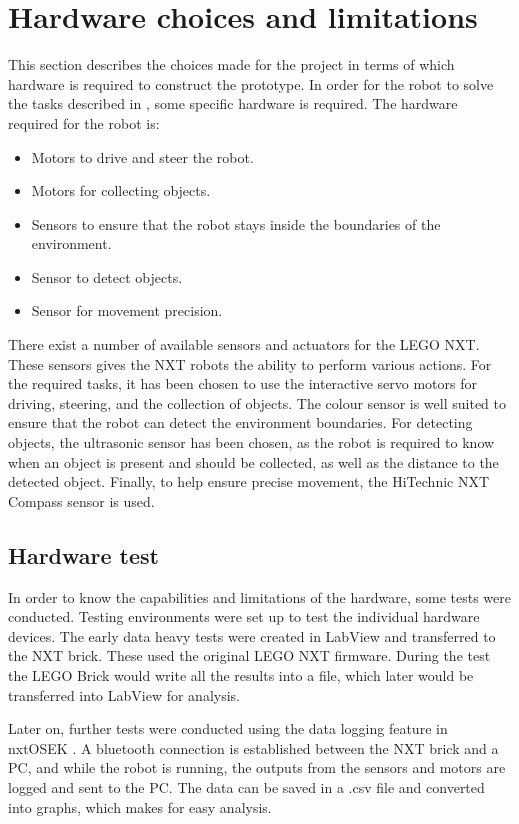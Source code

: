 \section{Hardware choices and limitations}\label{sec:hardware}

This section describes the choices made for the project in terms of which hardware is required to construct the \projname{} prototype. In order for the robot to solve the tasks described in , some specific hardware is required. The hardware required for the robot is:

\begin{itemize}
\item Motors to drive and steer the robot.
\item Motors for collecting objects.
\item Sensors to ensure that the robot stays inside the boundaries of the environment.
\item Sensor to detect objects.
\item Sensor for movement precision.
\end{itemize}

There exist a number of available sensors and actuators for the LEGO NXT. These sensors gives the NXT robots the ability to perform various actions. For the required tasks, it has been chosen to use the interactive servo motors for driving, steering, and the collection of objects. The colour sensor is well suited to ensure that the robot can detect the environment boundaries. For detecting objects, the ultrasonic sensor has been chosen, as the robot is required to know when an object is present and should be collected, as well as the distance to the detected object. Finally, to help ensure precise movement, the HiTechnic NXT Compass sensor is used.

\subsection{Hardware test} \label{sec:hardware_test}
In order to know the capabilities and limitations of the hardware, some tests were conducted. Testing environments were set up to test the individual hardware devices. The early data heavy tests  were created in LabView and transferred to the NXT brick. These used the original LEGO NXT firmware. During the test the LEGO Brick would write all the results into a file, which later would be transferred into LabView for analysis. 

Later on, further tests were conducted using the data logging feature in nxtOSEK \citep{datalogging}. A bluetooth connection is established between the NXT brick and a PC, and while the robot is running, the outputs from the sensors and motors are logged and sent to the PC. The data can be saved in a .csv file and converted into graphs, which makes for easy analysis.

